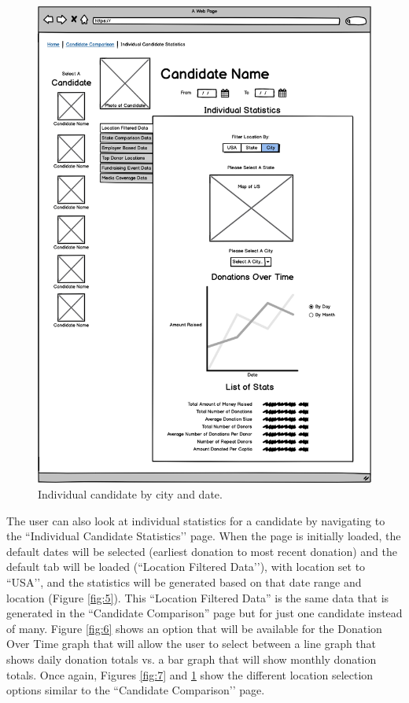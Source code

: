 \documentclass[12pt]{article}
\begin{document}
    \begin{figure}[H]
        \begin{center}
        \includegraphics[scale=.3]{candidatefiltercityday}
        \caption{Individual candidate by city and date.}
        \label{fig:8}
        \end{center}
    \end{figure}
    
  The user can also look at individual statistics for a candidate by navigating to the ``Individual Candidate Statistics’’ page. When the page is initially loaded, the default dates will be selected (earliest donation to most recent donation) and the default tab will be loaded (``Location Filtered Data’’), with location set to ``USA’’, and the statistics will be generated based on that date range and location (Figure \ref{fig:5}). This “Location Filtered Data” is the same data that is generated in the “Candidate Comparison” page but for just one candidate instead of many. Figure \ref{fig:6} shows an option that will be available for the Donation Over Time graph that will allow the user to select between a line graph that shows daily donation totals vs. a bar graph that will show monthly donation totals. Once again, Figures \ref{fig:7} and \ref{fig:8} show the different location selection options similar to the ``Candidate Comparison’’ page.
\end{document}
